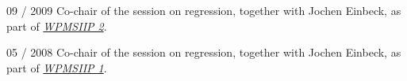 \documentclass[a4paper]{simplecv}
\begin{document}
\begin{topic}
\item[09 / 2009] Co-chair of the session on regression, together with Jochen Einbeck,
                 as part of \emph{\href{http://www.stat.uni-muenchen.de/~walter/workshop0909/}{WPMSIIP 2}}.

\item[05 / 2008] Co-chair of the session on regression, together with Jochen Einbeck,
                 as part of \emph{\href{http://www.maths.dur.ac.uk/users/matthias.troffaes/workshopip2008/index.html}{WPMSIIP 1}}.
\end{topic}




\renewcommand\refname{List of publications}
\label{publications}

%
\end{document}
